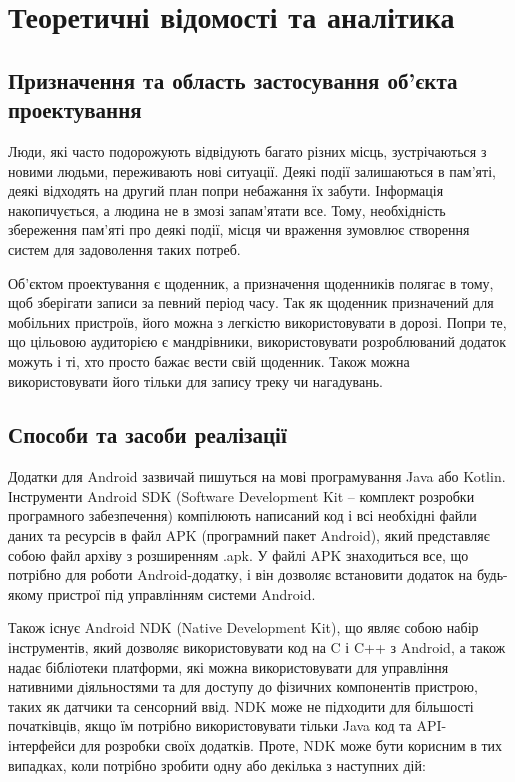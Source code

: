 \documentclass[../main.tex]{subfiles}
\begin{document}
\chapter{Теоретичні відомості та аналітика}

\section{Призначення та область застосування об'єкта проектування}

Люди, які часто подорожують відвідують багато різних місць, зустрічаються з новими людьми, переживають нові ситуації. Деякі події залишаються в пам'яті, деякі відходять на другий план попри небажання їх забути. Інформація накопичується, а людина не в змозі запам'ятати все. Тому, необхідність збереження пам'яті про деякі події, місця чи враження зумовлює створення систем для задоволення таких потреб.

Об'єктом проектування є щоденник, а призначення щоденників полягає в тому, щоб зберігати записи за певний період часу. Так як щоденник призначений для мобільних пристроїв, його можна з легкістю використовувати в дорозі. Попри те, що цільовою аудиторією є мандрівники, використовувати розроблюваний додаток можуть і ті, хто просто бажає вести свій щоденник. Також можна використовувати його тільки для запису треку чи нагадувань.

\section{Способи та засоби реалізації}

Додатки для Android зазвичай пишуться на мові програмування Java або Kotlin. Інструменти Android SDK (Software Development Kit -- комплект розробки програмного забезпечення) компілюють написаний код і всі необхідні файли даних та ресурсів в файл APK (програмний пакет Android), який представляє собою файл архіву з розширенням .apk. У файлі APK знаходиться все, що потрібно для роботи Android-додатку, і він дозволяє встановити додаток на будь-якому пристрої під управлінням системи Android. 

Також існує Android NDK (Native Development Kit), що являє собою набір інструментів, який дозволяє використовувати код на C і C++ з Android, а також надає бібліотеки платформи, які можна використовувати для управління нативними діяльностями та для доступу до фізичних компонентів пристрою, таких як датчики та сенсорний ввід. NDK може не підходити для більшості початківців, якщо їм потрібно використовувати тільки Java код та API-інтерфейси для розробки своїх додатків. Проте, NDK може бути корисним в тих випадках, коли потрібно зробити одну або декілька з наступних дій:
\end{document}
